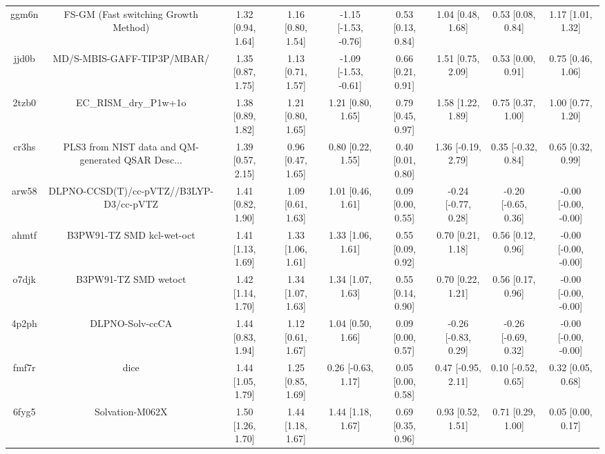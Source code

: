 \documentclass{article}
\begin{document}
\begin{center}
\begin{longtable}{|ccccccccc|}
 ggm6n &               FS-GM (Fast switching Growth Method) &  1.32 [0.94, 1.64] &  1.16 [0.80, 1.54] &  -1.15 [-1.53, -0.76] &  0.53 [0.13, 0.84] &    1.04 [0.48, 1.68] &    0.53 [0.08, 0.84] &     1.17 [1.01, 1.32] \\
 jjd0b &                         MD/S-MBIS-GAFF-TIP3P/MBAR/ &  1.35 [0.87, 1.75] &  1.13 [0.71, 1.57] &  -1.09 [-1.53, -0.61] &  0.66 [0.21, 0.91] &    1.51 [0.75, 2.09] &    0.53 [0.00, 0.91] &     0.75 [0.46, 1.06] \\
 2tzb0 &                              EC\_RISM\_dry\_P1w+1o &  1.38 [0.89, 1.82] &  1.21 [0.80, 1.65] &     1.21 [0.80, 1.65] &  0.79 [0.45, 0.97] &    1.58 [1.22, 1.89] &    0.75 [0.37, 1.00] &     1.00 [0.77, 1.20] \\
 cr3hs &  PLS3 from NIST data and QM-generated QSAR Desc... &  1.39 [0.57, 2.15] &  0.96 [0.47, 1.65] &     0.80 [0.22, 1.55] &  0.40 [0.01, 0.80] &   1.36 [-0.19, 2.79] &   0.35 [-0.32, 0.84] &     0.65 [0.32, 0.99] \\
 arw58 &            DLPNO-CCSD(T)/cc-pVTZ//B3LYP-D3/cc-pVTZ &  1.41 [0.82, 1.90] &  1.09 [0.61, 1.63] &     1.01 [0.46, 1.61] &  0.09 [0.00, 0.55] &  -0.24 [-0.77, 0.28] &  -0.20 [-0.65, 0.36] &  -0.00 [-0.00, -0.00] \\
 ahmtf &                          B3PW91-TZ SMD kcl-wet-oct &  1.41 [1.13, 1.69] &  1.33 [1.06, 1.61] &     1.33 [1.06, 1.61] &  0.55 [0.09, 0.92] &    0.70 [0.21, 1.18] &    0.56 [0.12, 0.96] &  -0.00 [-0.00, -0.00] \\
 o7djk &                               B3PW91-TZ SMD wetoct &  1.42 [1.14, 1.70] &  1.34 [1.07, 1.63] &     1.34 [1.07, 1.63] &  0.55 [0.14, 0.90] &    0.70 [0.22, 1.21] &    0.56 [0.17, 0.96] &  -0.00 [-0.00, -0.00] \\
 4p2ph &                                    DLPNO-Solv-ccCA &  1.44 [0.83, 1.94] &  1.12 [0.61, 1.67] &     1.04 [0.50, 1.66] &  0.09 [0.00, 0.57] &  -0.26 [-0.83, 0.29] &  -0.26 [-0.69, 0.32] &  -0.00 [-0.00, -0.00] \\
 fmf7r &                                               dice &  1.44 [1.05, 1.79] &  1.25 [0.85, 1.69] &    0.26 [-0.63, 1.17] &  0.05 [0.00, 0.58] &   0.47 [-0.95, 2.11] &   0.10 [-0.52, 0.65] &     0.32 [0.05, 0.68] \\
 6fyg5 &                                    Solvation-M062X &  1.50 [1.26, 1.70] &  1.44 [1.18, 1.67] &     1.44 [1.18, 1.67] &  0.69 [0.35, 0.96] &    0.93 [0.52, 1.51] &    0.71 [0.29, 1.00] &     0.05 [0.00, 0.17] \\

\end{longtable}
\end{center}
\end{document}
